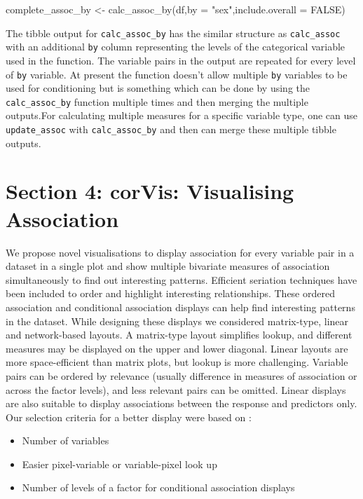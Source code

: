 \begin{Schunk}
\begin{Sinput}
complete_assoc_by <- calc_assoc_by(df,by = "sex",include.overall = FALSE)
\end{Sinput}
\end{Schunk}

The tibble output for \texttt{calc\_assoc\_by} has the similar structure
as \texttt{calc\_assoc} with an additional \texttt{by} column
representing the levels of the categorical variable used in the
function. The variable pairs in the output are repeated for every level
of \texttt{by} variable. At present the function doesn't allow multiple
\texttt{by} variables to be used for conditioning but is something which
can be done by using the \texttt{calc\_assoc\_by} function multiple
times and then merging the multiple outputs.For calculating multiple
measures for a specific variable type, one can use
\texttt{update\_assoc} with \texttt{calc\_assoc\_by} and then can merge
these multiple tibble outputs.

\hypertarget{section-4-corvis-visualising-association}{%
\section{Section 4: corVis: Visualising
Association}\label{section-4-corvis-visualising-association}}

We propose novel visualisations to display association for every
variable pair in a dataset in a single plot and show multiple bivariate
measures of association simultaneously to find out interesting patterns.
Efficient seriation techniques have been included to order and highlight
interesting relationships. These ordered association and conditional
association displays can help find interesting patterns in the dataset.
While designing these displays we considered matrix-type, linear and
network-based layouts. A matrix-type layout simplifies lookup, and
different measures may be displayed on the upper and lower diagonal.
Linear layouts are more space-efficient than matrix plots, but lookup is
more challenging. Variable pairs can be ordered by relevance (usually
difference in measures of association or across the factor levels), and
less relevant pairs can be omitted. Linear displays are also suitable to
display associations between the response and predictors only. Our
selection criteria for a better display were based on :

\begin{itemize}
\item Number of variables
\item Easier pixel-variable or variable-pixel
look up
\item Number of levels of a factor for conditional association displays
\end{itemize}


